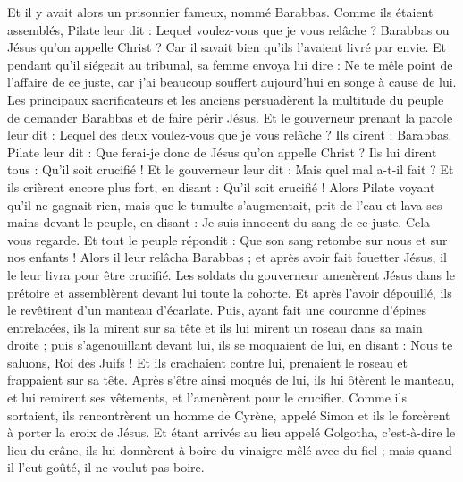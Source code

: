 \begin{multicols}{2}
Et il y avait alors un prisonnier fameux, nommé Barabbas.
Comme ils étaient assemblés, Pilate leur dit : Lequel voulez-vous que je vous relâche ? Barabbas ou Jésus qu'on appelle Christ ?
Car il savait bien qu'ils l'avaient livré par envie.
Et pendant qu'il siégeait au tribunal, sa femme envoya lui dire : Ne te mêle point de l'affaire de ce juste, car j'ai beaucoup souffert aujourd'hui en songe à cause de lui.
Les principaux sacrificateurs et les anciens persuadèrent la multitude du peuple de demander Barabbas et de faire périr Jésus.
Et le gouverneur prenant la parole leur dit : Lequel des deux voulez-vous que je vous relâche ? Ils dirent : Barabbas.
Pilate leur dit : Que ferai-je donc de Jésus qu'on appelle Christ ? Ils lui dirent tous : Qu'il soit crucifié !
Et le gouverneur leur dit : Mais quel mal a-t-il fait ? Et ils crièrent encore plus fort, en disant : Qu'il soit crucifié !
Alors Pilate voyant qu'il ne gagnait rien, mais que le tumulte s'augmentait, prit de l'eau et lava ses mains devant le peuple, en disant : Je suis innocent du sang de ce juste. Cela vous regarde.
Et tout le peuple répondit : Que son sang retombe sur nous et sur nos enfants !
Alors il leur relâcha Barabbas ; et après avoir fait fouetter Jésus, il le leur livra pour être crucifié.
Les soldats du gouverneur amenèrent Jésus dans le prétoire et assemblèrent devant lui toute la cohorte.
Et après l'avoir dépouillé, ils le revêtirent d'un manteau d'écarlate.
Puis, ayant fait une couronne d'épines entrelacées, ils la mirent sur sa tête et ils lui mirent un roseau dans sa main droite ; puis s'agenouillant devant lui, ils se moquaient de lui, en disant : Nous te saluons, Roi des Juifs !
Et ils crachaient contre lui, prenaient le roseau et frappaient sur sa tête.
Après s'être ainsi moqués de lui, ils lui ôtèrent le manteau, et lui remirent ses vêtements, et l'amenèrent pour le crucifier.
Comme ils sortaient, ils rencontrèrent un homme de Cyrène, appelé Simon et ils le forcèrent à porter la croix de Jésus.
Et étant arrivés au lieu appelé Golgotha, c'est-à-dire le lieu du crâne,
ils lui donnèrent à boire du vinaigre mêlé avec du fiel ; mais quand il l'eut goûté, il ne voulut pas boire.

\end{multicols}
